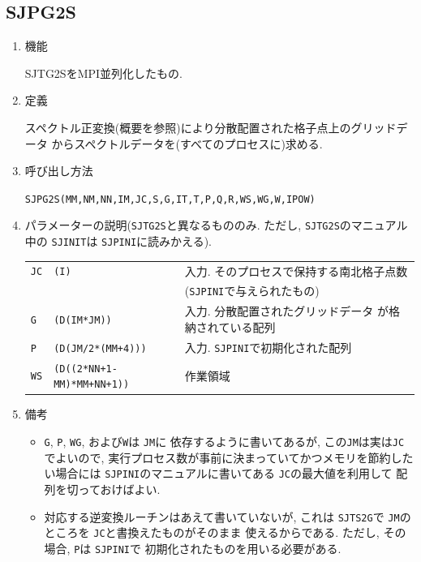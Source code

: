 \documentclass[a4j,fleqn]{jarticle}
\begin{document}

\subsection{SJPG2S}

\begin{enumerate}

\item 機能

SJTG2SをMPI並列化したもの.

\item 定義

スペクトル正変換(概要を参照)により分散配置された格子点上のグリッドデータ
からスペクトルデータを(すべてのプロセスに)求める.

\item 呼び出し方法 

{\tt SJPG2S(MM,NM,NN,IM,JC,S,G,IT,T,P,Q,R,WS,WG,W,IPOW)}
  
\item パラメーターの説明({\tt SJTG2S}と異なるもののみ.
ただし, {\tt SJTG2S}のマニュアル中の {\tt SJINIT}は
{\tt SJPINI}に読みかえる).

\begin{tabular}{lll}
{\tt JC} & {\tt (I)} & 入力. そのプロセスで保持する南北格子点数\\
         &           &    ({\tt SJPINI}で与えられたもの)\\
{\tt G} & {\tt (D(IM*JM))} & 入力. 分散配置されたグリッドデータ
	が格納されている配列\\
{\tt P}  & {\tt (D(JM/2*(MM+4)))} & 入力. {\tt SJPINI}で初期化された配列\\
{\tt WS}  & {\tt (D((2*NN+1-MM)*MM+NN+1))} & 作業領域
\end{tabular}

\item 備考

\begin{itemize}
\item {\tt G}, {\tt P}, {\tt WG}, および{\tt W}は {\tt JM}に
依存するように書いてあるが, この{\tt JM}は実は{\tt JC}でよいので,
実行プロセス数が事前に決まっていてかつメモリを節約したい場合には
{\tt SJPINI}のマニュアルに書いてある {\tt JC}の最大値を利用して
配列を切っておけばよい.
   
\item 対応する逆変換ルーチンはあえて書いていないが, これは
 {\tt SJTS2G}で {\tt JM}のところを {\tt JC}と書換えたものがそのまま
 使えるからである. ただし, その場合, {\tt P}は {\tt SJPINI}で
 初期化されたものを用いる必要がある.

\end{itemize}

\end{enumerate}
\end{document}
